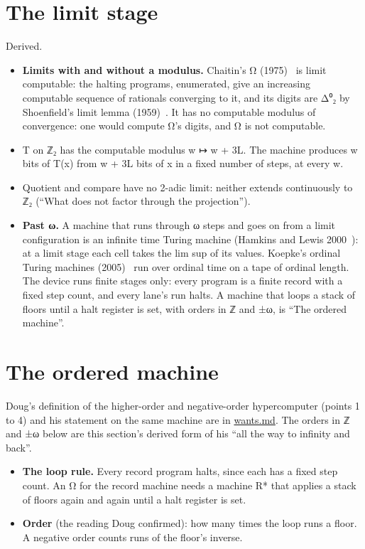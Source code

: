 \section{\texorpdfstring{The limit stage}{The limit stage}}

Derived.

\begin{itemize}
\item \textbf{Limits with and without a modulus.} Chaitin's Ω (1975)~\cite{src:Chaitin-1975} is limit computable: the halting programs, enumerated, give an increasing computable sequence of rationals converging to it, and its digits are Δ⁰₂ by Shoenfield's limit lemma (1959)~\cite{src:Shoenfield-1959}. It has no computable modulus of convergence: one would compute Ω's digits, and Ω is not computable.
\item T on ℤ₂ has the computable modulus w ↦ w + 3L. The machine produces w bits of T(x) from w + 3L bits of x in a fixed number of steps, at every w.
\item Quotient and compare have no 2-adic limit: neither extends continuously to ℤ₂ (“What does not factor through the projection”).
\item \textbf{Past ω.} A machine that runs through ω steps and goes on from a limit configuration is an infinite time Turing machine (Hamkins and Lewis 2000~\cite{src:Hamkins-and-Lewis-2000}): at a limit stage each cell takes the lim sup of its values. Koepke's ordinal Turing machines (2005)~\cite{src:Koepke-2005} run over ordinal time on a tape of ordinal length. The device runs finite stages only: every program is a finite record with a fixed step count, and every lane's run halts. A machine that loops a stack of floors until a halt register is set, with orders in ℤ and ±ω, is “The ordered machine”.
\end{itemize}

\section{\texorpdfstring{The ordered machine}{The ordered machine}}

Doug's definition of the higher-order and negative-order hypercomputer (points 1 to 4) and his statement on the same machine are in \hyperref[chap:wants]{wants.md}. The orders in ℤ and ±ω below are this section's derived form of his “all the way to infinity and back”.

\begin{itemize}
\item \textbf{The loop rule.} Every record program halts, since each has a fixed step count. An Ω for the record machine needs a machine R* that applies a stack of floors again and again until a halt register is set.
\item \textbf{Order} (the reading Doug confirmed): how many times the loop runs a floor. A negative order counts runs of the floor's inverse.
\end{itemize}

